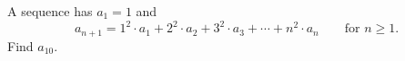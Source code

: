 A sequence has $a_1=1$ and
\[a_{n+1}=1^2\cdot a_1+2^2\cdot a_2+3^2\cdot a_3+\cdots+n^2\cdot a_n\qquad\text{for } n\ge1.\]
Find $a_{10}$.
